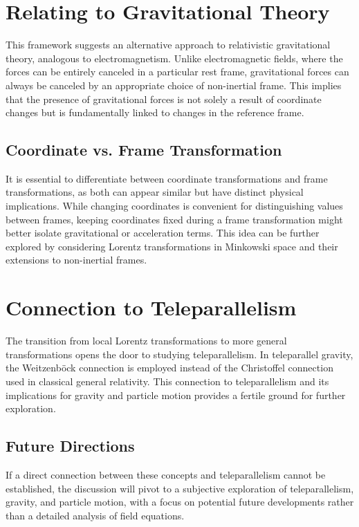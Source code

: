 \documentclass[12pt]{article}
\begin{document}
\section{Relating to Gravitational Theory}
This framework suggests an alternative approach to relativistic gravitational theory, analogous to electromagnetism. Unlike electromagnetic fields, where the forces can be entirely canceled in a particular rest frame, gravitational forces can always be canceled by an appropriate choice of non-inertial frame. This implies that the presence of gravitational forces is not solely a result of coordinate changes but is fundamentally linked to changes in the reference frame.

\subsection{Coordinate vs. Frame Transformation}
It is essential to differentiate between coordinate transformations and frame transformations, as both can appear similar but have distinct physical implications. While changing coordinates is convenient for distinguishing values between frames, keeping coordinates fixed during a frame transformation might better isolate gravitational or acceleration terms. This idea can be further explored by considering Lorentz transformations in Minkowski space and their extensions to non-inertial frames.

\section{Connection to Teleparallelism}
The transition from local Lorentz transformations to more general transformations opens the door to studying teleparallelism. In teleparallel gravity, the Weitzenböck connection is employed instead of the Christoffel connection used in classical general relativity. This connection to teleparallelism and its implications for gravity and particle motion provides a fertile ground for further exploration.

\subsection{Future Directions}
If a direct connection between these concepts and teleparallelism cannot be established, the discussion will pivot to a subjective exploration of teleparallelism, gravity, and particle motion, with a focus on potential future developments rather than a detailed analysis of field equations.
\end{document}
